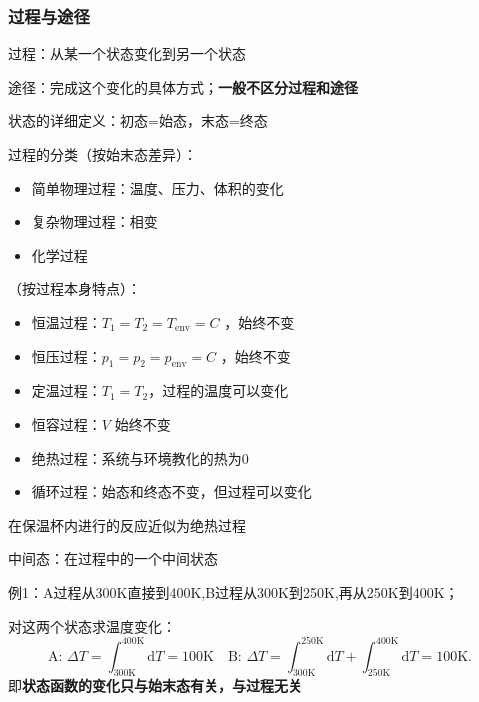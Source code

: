\subsubsection*{过程与途径}%
\label{subsub:过程与途径}
\begin{defi}
    过程：从某一个状态变化到另一个状态

    途径：完成这个变化的具体方式；\textbf{一般不区分过程和途径}
\end{defi}
\begin{defi}
    状态的详细定义：初态=始态，末态=终态
\end{defi}
过程的分类（按始末态差异）：
\begin{itemize}
    \item 简单物理过程：温度、压力、体积的变化
    \item 复杂物理过程：相变
    \item 化学过程
\end{itemize}
（按过程本身特点）：
\begin{itemize}
    \item 恒温过程：$T_1=T_2=T_\text{env}=C$ ，始终不变
    \item 恒压过程：$p_1=p_2=p_\text{env}=C$ ，始终不变
    \item 定温过程：$T_1=T_2$，过程的温度可以变化
    \item 恒容过程：$V$ 始终不变
    \item 绝热过程：系统与环境教化的热为0
    \item 循环过程：始态和终态不变，但过程可以变化
\end{itemize}
\begin{eg}
在保温杯内进行的反应近似为绝热过程
\end{eg}
\begin{defi}
    中间态：在过程中的一个中间状态
\end{defi}
\begin{eg}
    例1：A过程从300K直接到400K,B过程从300K到250K,再从250K到400K；

    对这两个状态求温度变化：
    \[
        \text{A: }\Delta T = \int_{300\text{K}}^{400\text{K}} \mathrm{d}T = 100\text{K} \quad \text{B: }\Delta T = \int_{300\text{K}}^{250\text{K}}  \mathrm{d}T + \int_{250\text{K}}^{400\text{K}}  \mathrm{d}T = 100\text{K}
    .\]
    即\textbf{状态函数的变化只与始末态有关，与过程无关}
\end{eg}

